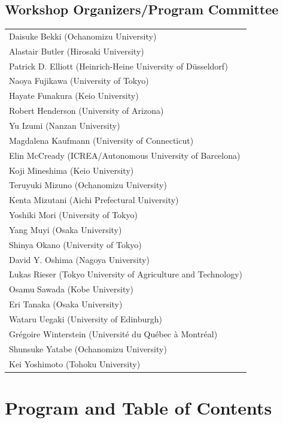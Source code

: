 \documentclass[12pt]{ltjarticle}
\begin{document}
\subsection*{Workshop Organizers/Program Committee}
\begin{flushleft}
\begin{tabular}{l}
Daisuke Bekki (Ochanomizu University) \\
Alastair Butler (Hirosaki University) \\
Patrick D. Elliott (Heinrich-Heine University of Düsseldorf) \\
Naoya Fujikawa (University of Tokyo) \\
Hayate Funakura (Keio University) \\
Robert Henderson (University of Arizona) \\
Yu Izumi (Nanzan University) \\
Magdalena Kaufmann (University of Connecticut) \\
Elin McCready (ICREA/Autonomous University of Barcelona) \\
Koji Mineshima (Keio University) \\
Teruyuki Mizuno (Ochanomizu University) \\
Kenta Mizutani (Aichi Prefectural University) \\
Yoshiki Mori (University of Tokyo) \\
Yang Muyi (Osaka University) \\
Shinya Okano (University of Tokyo) \\
David Y. Oshima (Nagoya University) \\
Lukas Rieser (Tokyo University of Agriculture and Technology) \\
Osamu Sawada (Kobe University) \\
Eri Tanaka (Osaka University) \\
Wataru Uegaki (University of Edinburgh) \\
Grégoire Winterstein (Université du Québec à Montréal) \\
Shunsuke Yatabe (Ochanomizu University) \\
Kei Yoshimoto (Tohoku University) \\

\end{tabular}
\end{flushleft}
\newpage
  
\section*{Program and Table of Contents}
\end{document}
